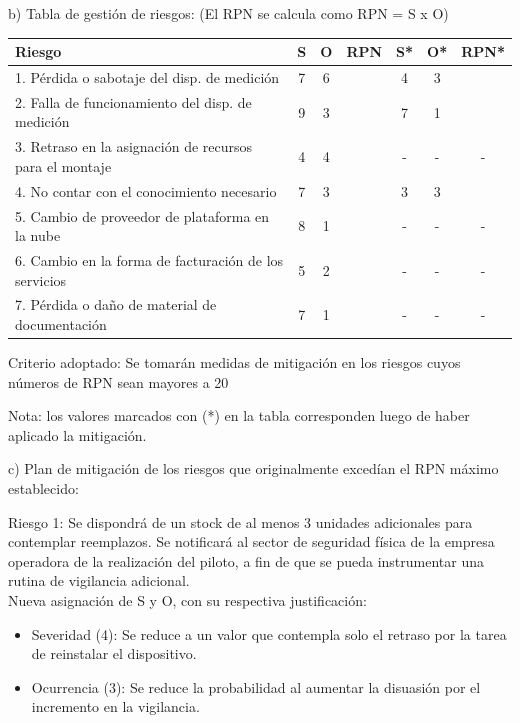 \documentclass[
11pt, %
]{charter}
\begin{document}
b) Tabla de gestión de riesgos:      (El RPN se calcula como RPN = S x O)

\begin{table}[htpb]
\centering
\begin{tabularx}{\linewidth}{@{}|X|c|c|c|c|c|c|@{}}
\hline
\rowcolor[HTML]{C0C0C0} 
Riesgo & S & O & RPN & S* & O* & RPN* \\ \hline
1. Pérdida o sabotaje del disp. de medición            & 7  & 6  & \cellcolor{mirojo}{42}    & 4 & 3 & \cellcolor{miverde}{12} \\ \hline
2. Falla de funcionamiento del disp. de medición       & 9  & 3  & \cellcolor{mirojo}{27}    & 7 & 1 & \cellcolor{miverde}{7}  \\ \hline
3. Retraso en la asignación de recursos para el montaje& 4  & 4  & \cellcolor{miverde}{16}   &  -  &  - &  -    \\ \hline
4. No contar con el conocimiento necesario             & 7  & 3  & \cellcolor{mirojo}{21}    & 3 & 3 & \cellcolor{miverde}{9}   \\ \hline
5. Cambio de proveedor de plataforma en la nube        & 8  & 1  & \cellcolor{miverde}{8}   &  -  &  -  & -     \\ \hline
6. Cambio en la forma de facturación de los servicios  & 5  & 2  & \cellcolor{miverde}{10}    & -   &  -  &  -  \\ \hline
7. Pérdida o daño de material de documentación         & 7  & 1  & \cellcolor{miverde}{7}   &  -  &  -  &  -    \\ \hline
\end{tabularx}%
\end{table}

Criterio adoptado: 
Se tomarán medidas de mitigación en los riesgos cuyos números de RPN sean mayores a 20

Nota: los valores marcados con (*) en la tabla corresponden luego de haber aplicado la mitigación.

c) Plan de mitigación de los riesgos que originalmente excedían el RPN máximo establecido:
 
Riesgo 1: Se dispondrá de un stock de al menos 3 unidades adicionales para contemplar reemplazos. Se notificará al sector de seguridad física de la empresa operadora de la realización del piloto, a fin de que se pueda instrumentar una rutina de vigilancia adicional.\\
Nueva asignación de S y O, con su respectiva justificación:
\begin{itemize}
	\item Severidad (4): Se reduce a un valor que contempla solo el retraso por la tarea de reinstalar el dispositivo.
	\item Ocurrencia (3): Se reduce la probabilidad al aumentar la disuasión por el incremento en la vigilancia.
\end{itemize}
 
\end{document}
